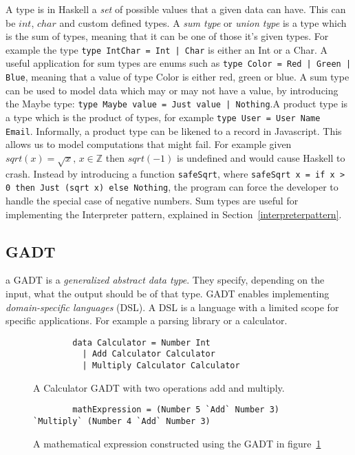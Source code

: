 A type is in Haskell a \textit{set} of possible values that a given data can
have. This can be $int$, $char$ and custom defined types. A \textit{sum type} or
\textit{union type} is a type which is the sum of types, meaning that it can be
one of those it's given types. For example the type \texttt{type IntChar = Int |
Char} is either an Int or a Char. A useful application for sum types are enums
such as \texttt{type Color = Red | Green | Blue}, meaning that a value of type
Color is either red, green or blue. A sum type can be used to model data which
may or may not have a value, by introducing the Maybe type: \texttt{type Maybe
value = Just value | Nothing}.A product type is a type which is the product of
types, for example \texttt{type User = User Name Email}.  Informally, a product
type can be likened to a record in Javascript.  This allows us to model
computations that might fail. For example given $sqrt(x) = \sqrt{x},\, x\in
\mathbb{Z}$ then $sqrt(-1)$ is undefined and would cause Haskell to crash.
Instead by introducing a function \texttt{safeSqrt}, where \texttt{safeSqrt x =
if x > 0 then Just (sqrt x) else Nothing}, the program can force the developer to
handle the special case of negative numbers. Sum types are useful for
implementing the Interpreter pattern, explained in
Section~\ref{interpreterpattern}.

\subsection{GADT}\label{gadt}

a GADT is a \textit{generalized abstract data type}.  They specify, depending on
the input, what the output should be of that type. GADT enables implementing
\textit{domain-specific languages} (DSL). A DSL is a language with a limited
scope for specific applications. For example a parsing library or a calculator.

\begin{figure}[H]
    \begin{lstlisting}
        data Calculator = Number Int         
          | Add Calculator Calculator 
          | Multiply Calculator Calculator 
    \end{lstlisting}
    \caption{A Calculator GADT with two operations add and multiply.}
    \label{gadtcalculator}
\end{figure}

\begin{figure}[H]
    \begin{lstlisting}
        mathExpression = (Number 5 `Add` Number 3) `Multiply` (Number 4 `Add` Number 3)
    \end{lstlisting}
    \caption{A mathematical expression constructed using the GADT in
    figure~\ref{gadtcalculator}}
    \label{mathexpressiongadt}
\end{figure}


